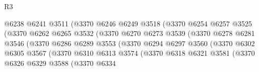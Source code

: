 \begin{lexlean}{R3}
\begin{coremodule}
                                    @6238
                                    @6241
                                    @3511
                                    (@3370
                                      @6246
                                      @6249
                                      @3518
                                      (@3370
                                        @6254
                                        @6257
                                        @3525
                                        (@3370
                                          @6262
                                          @6265
                                          @3532
                                          (@3370
                                            @6270
                                            @6273
                                            @3539
                                            (@3370
                                              @6278
                                              @6281
                                              @3546
                                              (@3370
                                                @6286
                                                @6289
                                                @3553
                                                (@3370
                                                  @6294
                                                  @6297
                                                  @3560
                                                  (@3370
                                                    @6302
                                                    @6305
                                                    @3567
                                                    (@3370
                                                      @6310
                                                      @6313
                                                      @3574
                                                      (@3370
                                                        @6318
                                                        @6321
                                                        @3581
                                                        (@3370
                                                          @6326
                                                          @6329
                                                          @3588
                                                          (@3370
                                                            @6334

\end{coremodule}
\end{lexlean}
